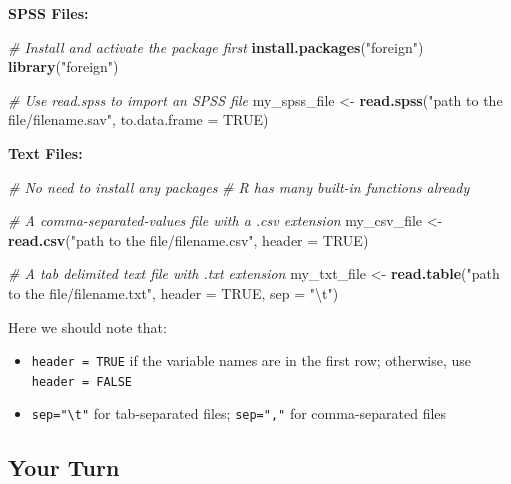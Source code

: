 \documentclass[]{book}
\newenvironment{Shaded}{\begin{snugshade}}{\end{snugshade}}
\newcommand{\CharTok}[1]{\textcolor[rgb]{0.31,0.60,0.02}{#1}}
\newcommand{\CommentTok}[1]{\textcolor[rgb]{0.56,0.35,0.01}{\textit{#1}}}
\newcommand{\DataTypeTok}[1]{\textcolor[rgb]{0.13,0.29,0.53}{#1}}
\newcommand{\KeywordTok}[1]{\textcolor[rgb]{0.13,0.29,0.53}{\textbf{#1}}}
\newcommand{\NormalTok}[1]{#1}
\newcommand{\OtherTok}[1]{\textcolor[rgb]{0.56,0.35,0.01}{#1}}
\newcommand{\StringTok}[1]{\textcolor[rgb]{0.31,0.60,0.02}{#1}}
\providecommand{\tightlist}{%
  \setlength{\itemsep}{0pt}\setlength{\parskip}{0pt}}
\begin{document}
\textbf{SPSS Files:}

\begin{Shaded}
\begin{Highlighting}[]
\CommentTok{# Install and activate the package first}
\KeywordTok{install.packages}\NormalTok{(}\StringTok{"foreign"}\NormalTok{)}
\KeywordTok{library}\NormalTok{(}\StringTok{"foreign"}\NormalTok{)}

\CommentTok{# Use read.spss to import an SPSS file}
\NormalTok{my_spss_file <-}\StringTok{ }\KeywordTok{read.spss}\NormalTok{(}\StringTok{"path to the file/filename.sav"}\NormalTok{, }\DataTypeTok{to.data.frame =} \OtherTok{TRUE}\NormalTok{)}
\end{Highlighting}
\end{Shaded}

\textbf{Text Files:}

\begin{Shaded}
\begin{Highlighting}[]
\CommentTok{# No need to install any packages}
\CommentTok{# R has many built-in functions already}

\CommentTok{# A comma-separated-values file with a .csv extension}
\NormalTok{my_csv_file <-}\StringTok{ }\KeywordTok{read.csv}\NormalTok{(}\StringTok{"path to the file/filename.csv"}\NormalTok{, }\DataTypeTok{header =} \OtherTok{TRUE}\NormalTok{)}

\CommentTok{# A tab delimited text file with .txt extension}
\NormalTok{my_txt_file <-}\StringTok{ }\KeywordTok{read.table}\NormalTok{(}\StringTok{"path to the file/filename.txt"}\NormalTok{, }\DataTypeTok{header =} \OtherTok{TRUE}\NormalTok{, }\DataTypeTok{sep =} \StringTok{"}\CharTok{\textbackslash{}t}\StringTok{"}\NormalTok{)}
\end{Highlighting}
\end{Shaded}

Here we should note that:

\begin{itemize}
\tightlist
\item
  \texttt{header\ =\ TRUE} if the variable names are in the first row; otherwise, use \texttt{header\ =\ FALSE}
\item
  \texttt{sep="\textbackslash{}t"} for tab-separated files; \texttt{sep=","} for comma-separated files
\end{itemize}

\hypertarget{your-turn-2}{%
\subsection{Your Turn}\label{your-turn-2}}
\end{document}
